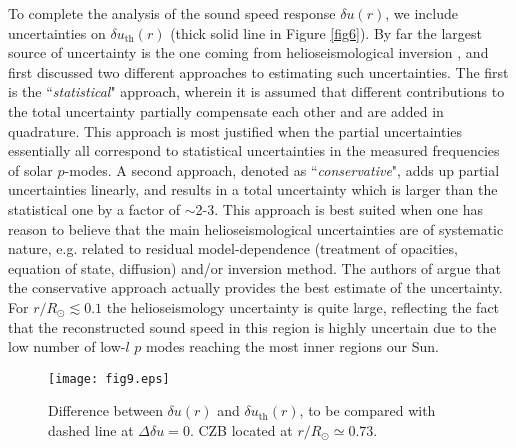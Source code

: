 \documentclass[aps,prl,twocolumn,showpacs]{revtex4}
\begin{document}
To complete the analysis of the sound speed response $\delta u(r)$, we include uncertainties on $\delta u_{\text{th}}(r)$ (thick solid line in Figure \ref{fig6}). By far the largest source of uncertainty is the one coming from helioseismological inversion \cite{helioseismologyuncertainty1,helioseismologyuncertainty2,helioseismologyuncertainty3}, and \cite{helioseismologyuncertainty1} first discussed two different approaches to estimating such uncertainties. The first is the ``\textit{statistical}" approach, wherein it is assumed that different contributions to the total uncertainty partially compensate each other and are added in quadrature. This approach is most justified when the partial uncertainties essentially all correspond to statistical uncertainties in the measured frequencies of solar $p$-modes. A second approach, denoted as ``\textit{conservative}", adds up partial uncertainties linearly, and results in a total uncertainty which is larger than the statistical one by a factor of $\sim$2-3. This approach is best suited when one has reason to believe that the main helioseismological uncertainties are of systematic nature, e.g. related to residual model-dependence (treatment of opacities, equation of state, diffusion) and/or inversion method. The authors of \cite{helioseismologyuncertainty1} argue that the conservative approach actually provides the best estimate of the uncertainty. For $r/R_{\odot} \lesssim 0.1$ the helioseismology uncertainty is quite large, reflecting the fact that the reconstructed sound speed in this region is highly uncertain due to the low number of low-$l$ $p$ modes reaching the most inner regions our Sun.
\begin{figure}[!h]
\texttt{[image: fig9.eps]}
\caption{Difference between $\delta u(r)$ and $\delta u_{\text{th}}(r)$, to be compared with dashed line at $\Delta \delta u = 0$. CZB located at $r/R_{\odot} \simeq 0.73$.}
\label{fig7}
\end{figure}
\end{document}
